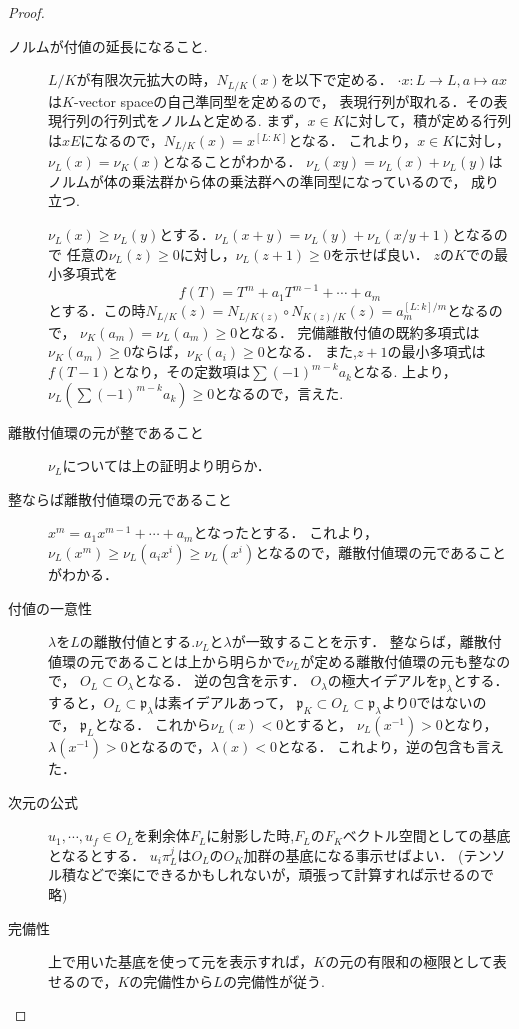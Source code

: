 \documentclass{ujarticle}
\begin{document}
\begin{proof}
\begin{description}
  \item[ノルムが付値の延長になること.]
    $L/K$が有限次元拡大の時，$N_{L/K}(x)$を以下で定める．
    $\cdot x: L \to L,a \mapsto ax$は$K$-vector spaceの自己準同型を定めるので，
    表現行列が取れる．その表現行列の行列式をノルムと定める.
    まず，$x \in K$に対して，積が定める行列は$xE$になるので，$N_{L/K}(x)=x^{[L:K]}$となる．
    これより，$x\in K$に対し，$\nu_L(x)=\nu_K(x)$となることがわかる．
    $\nu_L(xy)=\nu_L(x)+\nu_L(y)$はノルムが体の乗法群から体の乗法群への準同型になっているので，
    成り立つ.

    $\nu_L(x) \ge \nu_L(y)$とする．$\nu_L(x+y)=\nu_L(y)+\nu_L(x/y+1)$となるので
    任意の$\nu_L(z) \ge 0$に対し，$\nu_L(z+1) \ge 0$を示せば良い．
    $z$の$K$での最小多項式を
    \begin{equation*}
    f(T)= T^m + a_1T^{m-1} + \cdots + a_m
    \end{equation*}
    とする．この時$N_{L/K}(z)=N_{L/K(z)}\circ N_{K(z)/K}(z)=a_m^{[L:k]/m}$となるので，
    $\nu_K(a_m)=\nu_L(a_m) \ge 0$となる．
    完備離散付値の既約多項式は$\nu_K(a_m) \ge 0$ならば，$\nu_K(a_i) \ge 0$となる．
    また,$z+1$の最小多項式は$f(T-1)$となり，その定数項は$\sum(-1)^{m-k}a_k$となる.
    上より，$\nu_L(\sum(-1)^{m-k}a_k) \ge 0$となるので，言えた.

  \item[離散付値環の元が整であること]
  $\nu_L$については上の証明より明らか．
  \item[整ならば離散付値環の元であること]
  $x^m =  a_1x^{m-1} + \cdots  +a_m$となったとする．
  これより，$\nu_L(x^m) \ge \nu_L(a_ix^i) \ge \nu_L(x^i)$となるので，離散付値環の元であることがわかる．
  \item[付値の一意性]
  $\lambda$を$L$の離散付値とする.$\nu_L$と$\lambda$が一致することを示す．
  整ならば，離散付値環の元であることは上から明らかで$\nu_L$が定める離散付値環の元も整なので，
  $O_{L} \subset O_{\lambda}$となる．
  逆の包含を示す．
  $O_{\lambda}$の極大イデアルを$\mathfrak{p}_{\lambda}$とする．
  すると，$O_{L} \subset \mathfrak{p}_{\lambda}$は素イデアルあって，
  $\mathfrak{p}_K \subset O_{L} \subset \mathfrak{p}_{\lambda}$より$0$ではないので，
  $\mathfrak{p}_L$となる．
  これから$\nu_L(x) < 0$とすると，
  $\nu_L(x^{-1}) > 0$となり，
  $\lambda (x^{-1}) > 0$となるので，$\lambda (x) < 0$となる．
  これより，逆の包含も言えた．
  \item[次元の公式]
  $u_1,\cdots ,u_f \in O_L$を剰余体$F_L$に射影した時,$F_L$の$F_K$ベクトル空間としての基底となるとする．
   $u_i\pi_L^{j}$は$O_L$の$O_K$加群の基底になる事示せばよい．
   (テンソル積などで楽にできるかもしれないが，頑張って計算すれば示せるので略)
  \item[完備性]
  上で用いた基底を使って元を表示すれば，$K$の元の有限和の極限として表せるので，$K$の完備性から$L$の完備性が従う.
\end{description}
\end{proof}
\end{document}
